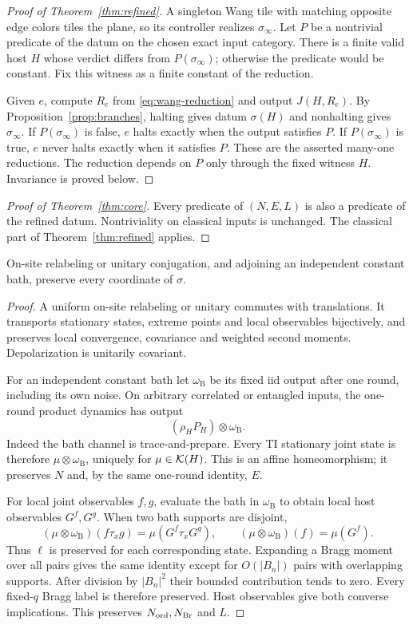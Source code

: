 \begin{proof}[Proof of Theorem~\ref{thm:refined}]
A singleton Wang tile with matching opposite edge colors tiles the plane, so its controller realizes $\sigma_\infty$. Let $P$ be a nontrivial predicate of the datum on the chosen exact input category. There is a finite valid host $H$ whose verdict differs from $P(\sigma_\infty)$; otherwise the predicate would be constant. Fix this witness as a finite constant of the reduction.

Given $e$, compute $R_e$ from \eqref{eq:wang-reduction} and output $J(H,R_e)$. By Proposition~\ref{prop:branches}, halting gives datum $\sigma(H)$ and nonhalting gives $\sigma_\infty$. If $P(\sigma_\infty)$ is false, $e$ halts exactly when the output satisfies $P$. If $P(\sigma_\infty)$ is true, $e$ never halts exactly when it satisfies $P$. These are the asserted many-one reductions. The reduction depends on $P$ only through the fixed witness $H$. Invariance is proved below.
\end{proof}

\begin{proof}[Proof of Theorem~\ref{thm:core}]
Every predicate of $(N,E,L)$ is also a predicate of the refined datum. Nontriviality on classical inputs is unchanged. The classical part of Theorem~\ref{thm:refined} applies.
\end{proof}

\begin{proposition}\label{prop:bath}
On-site relabeling or unitary conjugation, and adjoining an independent constant bath, preserve every coordinate of $\sigma$.
\end{proposition}
\begin{proof}
A uniform on-site relabeling or unitary commutes with translations. It transports stationary states, extreme points and local observables bijectively, and preserves local convergence, covariance and weighted second moments. Depolarization is unitarily covariant.

For an independent constant bath let $\omega_{\mathrm B}$ be its fixed iid output after one round, including its own noise. On arbitrary correlated or entangled inputs, the one-round product dynamics has output
\[
 (\rho_H P_H)\otimes\omega_{\mathrm B}.
\]
Indeed the bath channel is trace-and-prepare. Every TI stationary joint state is therefore $\mu\otimes\omega_{\mathrm B}$, uniquely for $\mu\in\mathcal K(H)$. This is an affine homeomorphism; it preserves $N$ and, by the same one-round identity, $E$.

For local joint observables $f,g$, evaluate the bath in $\omega_{\mathrm B}$ to obtain local host observables $G^f,G^g$. When two bath supports are disjoint,
\[
 (\mu\otimes\omega_{\mathrm B})(f\tau_xg)=\mu(G^f\tau_xG^g),
 \qquad (\mu\otimes\omega_{\mathrm B})(f)=\mu(G^f).
\]
Thus $\ell$ is preserved for each corresponding state. Expanding a Bragg moment over all pairs gives the same identity except for $O(|B_n|)$ pairs with overlapping supports. After division by $|B_n|^2$ their bounded contribution tends to zero. Every fixed-$q$ Bragg label is therefore preserved. Host observables give both converse implications. This preserves $N_{\mathrm{ord}},N_{\mathrm{Br}}$ and $L$.
\end{proof}

